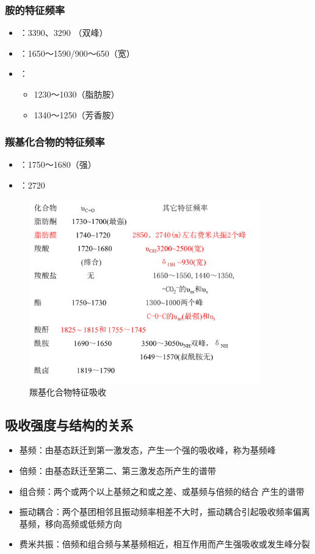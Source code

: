 \subsubsection*{胺的特征频率}
\begin{itemize}                  
	\item {}：3390、3290 （双峰）
	\item {}：1650～1590/900～650（宽）
	\item {}：
	\begin{itemize}
		\item 1230～1030（脂肪胺）
		\item 1340～1250（芳香胺）
	\end{itemize}
\end{itemize}
\subsubsection*{羰基化合物的特征频率}
\begin{itemize}  
	\item {}：1750～1680（强）
	\item {}：2720
\end{itemize}
\begin{figure}[ht]
	\centering
	\includegraphics[width=10cm]{image/chp5_co.png}
	\caption{羰基化合物特征吸收}
	\label{fig:chp5_co}
	
	
\end{figure}

\subsection{吸收强度与结构的关系}
\begin{itemize}
	\item 基频：由基态跃迁到第一激发态，产生一个强的吸收峰，称为基频峰
	\item 倍频：由基态跃迁至第二、第三激发态所产生的谱带
	\item 组合频：两个或两个以上基频之和或之差、或基频与倍频的结合 产生的谱带
	\item 振动耦合：两个基团相邻且振动频率相差不大时，振动耦合引起吸收频率偏离基频，移向高频或低频方向
	\item 费米共振：倍频和组合频与某基频相近，相互作用而产生强吸收或发生峰分裂
\end{itemize}



